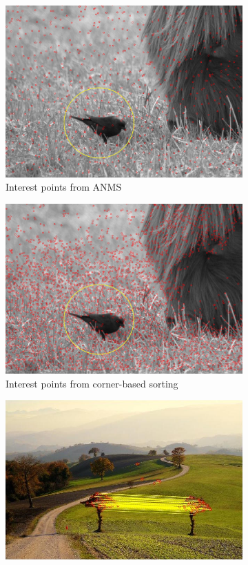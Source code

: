\documentclass[12pt]{article}
\begin{document}
\begin{figure}
\centering
\begin{subfigure}{.5\textwidth}
  \centering
  \includegraphics[width=.8\linewidth]{./gfx/ip_bird_anms.png}
  \caption{Interest points from ANMS}
  \label{fig:sub1}
\end{subfigure}%
\begin{subfigure}{.5\textwidth}
  \centering
  \includegraphics[width=.8\linewidth]{./gfx/ip_bird_high.png}
  \caption{Interest points from corner-based sorting}
  \label{fig:sub2}
\end{subfigure}
\begin{subfigure}{.5\textwidth}
  \centering
  \includegraphics[width=.8\linewidth]{./gfx/ip_high.jpg}

\end{subfigure}
\end{figure}
\end{document}

